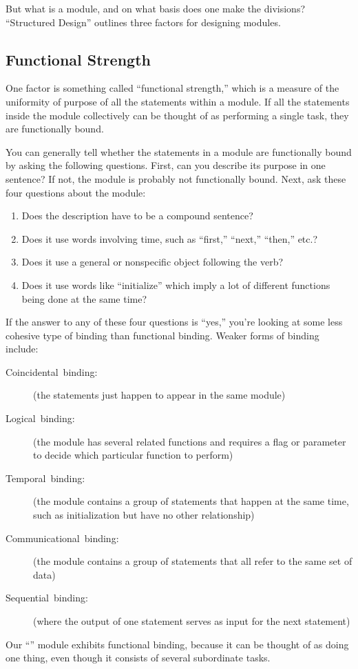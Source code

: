 But what is a module, and on what basis does one make the divisions?
``Structured Design'' outlines three factors for designing modules.


\subsection{Functional Strength}%
%
One factor is something called ``functional strength,'' which is a
measure of the uniformity of purpose of all the statements within a
module. If all the statements inside the module collectively can be
thought of as performing a single task, they are functionally bound.

You can generally tell whether the statements in a module are
functionally bound by asking the following questions. First, can you
describe its purpose in one sentence? If not, the module is probably
not functionally bound. Next, ask these four questions about the
module:
\begin{enumerate}
\item Does the description have to be a compound sentence?
\item Does it use words involving time, such as ``first,'' ``next,''
``then,'' etc.?
\item Does it use a general or nonspecific object following the verb?
\item Does it use words like ``initialize'' which imply a lot of
different functions being done at the same time?
\end{enumerate}
If the answer to any of these four questions is ``yes,'' you're
looking at some less cohesive type of binding than functional binding.
Weaker forms of binding include:

\begin{description}
\item [Coincidental~binding:]
(the statements just happen to appear in the same module)
\item [Logical~binding:]
(the module has several related functions and requires a flag or
parameter to decide which particular function to perform)
\item [Temporal~binding:]
(the module contains a group of statements that happen at the same
time, such as initialization but have no other relationship)
\item [Communicational~binding:]
(the module contains a group of statements that all refer
to the same set of data)
\item [Sequential~binding:]
(where the output of one statement serves as input for the next statement)
\end{description}
Our ``'' module exhibits functional binding, because
it can be thought of as doing one thing, even though it consists of
several subordinate tasks.%
%


